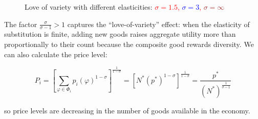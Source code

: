\documentclass[11pt,letterpaper]{article}
\begin{document}
    \begin{figure}[htp]
        \centering
            \caption{Love of variety with different elasticities: \textcolor{red}{$\sigma=1.5$, \textcolor{blue}{$\sigma=3$}, \textcolor{brown}{$\sigma=\infty$}}}
        \label{fig: ces-love}
    \end{figure}

\newpage

The factor $\tfrac{\sigma}{\sigma-1}>1$ captures the “love-of-variety” effect: when the elasticity of substitution is finite, adding new goods raises aggregate utility more than proportionally to their count because the composite good rewards diversity. We can also calculate the price level:


\begin{equation*}
    P_i = \left[ \sum_{\varphi \in \Phi_i } p_i(
\varphi)^{1-\sigma} \right]^{\tfrac{1}{1-\sigma} }  = \left[ N^* (p^*)^{1-\sigma} \right]^{\tfrac{1}{1-\sigma} }  = \frac{p^*}{(N^*)^{\tfrac{1}{\sigma-1} } } 
\end{equation*}

so price levels are decreasing in the number of goods available in the economy.
\end{document}
